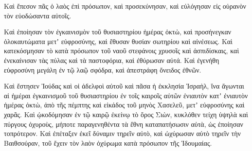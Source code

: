 {Καὶ ἔπεσον πᾶς ὁ λαὸς ἐπὶ πρόσωπον, καὶ προσεκύνησαν, καὶ εὐλόγησαν εἰς οὐρανὸν τὸν εὐοδώσαντα αὐτοῖς.
\par }{\PP {}Καὶ ἐποίησαν τὸν ἐγκαινισμὸν τοῦ θυσιαστηρίου ἡμέρας ὀκτὼ, καὶ προσήνεγκαν ὁλοκαυτώματα μετʼ εὐφροσύνης, καὶ ἔθυσαν θυσίαν σωτηρίου καὶ αἰνέσεως.
Καὶ κατεκόσμησαν τὸ κατὰ πρόσωπον τοῦ ναοῦ στεφάνοις χρυσοῖς καὶ ἀσπιδίσκαις, καὶ ἐνεκαίνισαν τὰς πύλας καὶ τὰ παστοφόρια, καὶ ἐθύρωσαν αὐτά.
Καὶ ἐγενήθη εὐφροσύνη μεγάλη ἐν τῷ λαῷ σφόδρα, καὶ ἀπεστράφη ὄνειδος ἐθνῶν.
\par }{\PP {}Καὶ ἔστησεν Ἰούδας καὶ οἱ ἀδελφοὶ αὐτοῦ καὶ πᾶσα ἡ ἐκκλησία Ἰσραὴλ, ἵνα ἄγωνται αἱ ἡμέραι ἐγκαινισμοῦ τοῦ θυσιαστηρίου ἐν τοῖς καιροῖς αὐτῶν ἐνιαυτὸν κατʼ ἐνιαυτὸν ἡμέρας ὀκτὼ, ἀπὸ τῆς πέμπτης καὶ εἰκάδος τοῦ μηνὸς Χασελεῦ, μετʼ εὐφροσύνης καὶ χαρᾶς.
Καὶ ᾠκοδόμησαν ἐν τῷ καιρῷ ἐκείνῳ τὸ ὄρος Σιὼν, κυκλόθεν τείχη ὑψηλὰ καὶ πύργους ὀχυροὺς, μήποτε παραγενηθέντα τὰ ἔθνη καταπατήσωσιν αὐτὰ, ὡς ἐποίησαν τοπρότερον.
Καὶ ἐπέταξεν ἐκεῖ δύναμιν τηρεῖν αὐτὸ, καὶ ὠχύρωσαν αὐτὸ τηρεῖν τὴν Βαιθσούραν, τοῦ ἔχειν τὸν λαὸν ὀχύρωμα κατὰ πρόσωπον τῆς Ἰδουμαίας.

}
